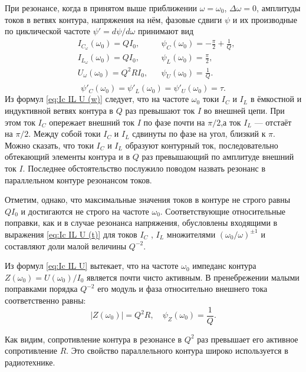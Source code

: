 \documentclass[a4paper, 12pt]{article}
\begin{document}
При резонансе, когда в принятом выше приближении $\omega = \omega_0$, $\Delta{\omega} = 0$, амплитуды токов в ветвях контура, напряжения на нём, фазовые сдвиги $\psi$ и их производные по циклической частоте $\psi' = d\psi/d\omega$ принимают вид
\begin{align}
& I_{C_{\omega}}(\omega_0) = Q I_0, & &\psi_C(\omega_0) = - \frac{\pi}{2} + \frac{1}{Q}, \\
& I_{L_{\omega}}(\omega_0) = Q I_0, & &\psi_L(\omega_0) = \frac{\pi}{2}, \label{eq:Ic IL U (w)} \\
& U_{\omega}(\omega_0) = Q^2 R I_0, & &\psi_U(\omega_0) = \frac{1}{Q}. \\
\end{align}
\begin{equation}\label{eq:psi C L U}
\psi'_C(\omega_0) = \psi'_L(\omega_0) = \psi'_U(\omega_0) = \tau.
\end{equation}
Из формул \eqref{eq:Ic IL U (w)} следует, что на частоте $\omega_0$ токи $I_C$ и $I_L$ в ёмкостной и индуктивной ветвях контура в $Q$ раз превышают ток $I$ во внешней цепи. При этом ток $I_C$ опережает внешний ток $I$ по фазе почти на $\pi/2$,а ток $I_L$ — отстаёт на $\pi/2$. Между собой токи $I_C$ и $I_L$ сдвинуты по фазе на угол, близкий к $\pi$. Можно сказать, что токи $I_C$ и $I_L$ образуют контурный ток, последовательно обтекающий элементы контура и в $Q$ раз превышающий по амплитуде внешний ток $I$. Последнее обстоятельство послужило поводом назвать резонанс в параллельном контуре резонансом токов.

Отметим, однако, что максимальные значения токов в контуре не строго равны $Q I_0$ и достигаются не строго на частоте $\omega_0$. Соответствующие относительные поправки, как и в случае резонанса напряжения, обусловлены входящими в выражения \eqref{eq:Ic IL U (t)} для токов $I_C$ , $I_L$ множителями $(\omega_0 / \omega)^{\pm 1}$ и составляют доли малой величины $Q^{-2}$.

Из формул \eqref{eq:Ic IL U} вытекает, что на частоте $\omega_0$ импеданс контура $Z(\omega_0) = U(\omega_0)/I_0$ является почти чисто активным. В пренебрежении малыми поправками порядка $Q^{-2}$ его модуль и фаза относительно внешнего тока соответственно равны:
\begin{equation}\label{eq:Z(w)}
|Z(\omega_0)| = Q^2 R, \quad \psi_Z(\omega_0) = \frac{1}{Q}.
\end{equation}

Как видим, сопротивление контура в резонансе в $Q^2$ раз превышает его активное сопротивление $R$. Это свойство параллельного контура широко используется в радиотехнике.
\end{document}
